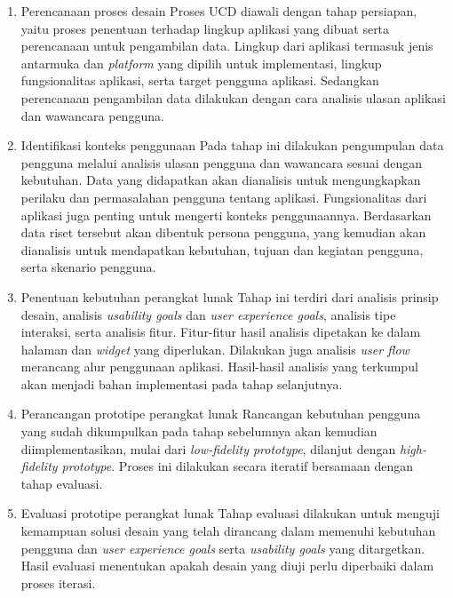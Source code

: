 \begin{enumerate}
  \item Perencanaan proses desain
  \subitem Proses UCD diawali dengan tahap persiapan, yaitu proses penentuan terhadap lingkup aplikasi yang dibuat serta perencanaan untuk pengambilan data. Lingkup dari aplikasi termasuk jenis antarmuka dan \textit{platform} yang dipilih untuk implementasi, lingkup fungsionalitas aplikasi, serta target pengguna aplikasi. Sedangkan perencanaan pengambilan data dilakukan dengan cara analisis ulasan aplikasi dan wawancara pengguna.

  \item Identifikasi konteks penggunaan
  \subitem Pada tahap ini dilakukan pengumpulan data pengguna melalui analisis ulasan pengguna dan wawancara sesuai dengan kebutuhan. Data yang didapatkan akan dianalisis untuk mengungkapkan perilaku dan permasalahan pengguna tentang aplikasi. Fungsionalitas dari aplikasi juga penting untuk mengerti konteks penggunaannya. Berdasarkan data riset tersebut akan dibentuk persona pengguna, yang kemudian akan dianalisis untuk mendapatkan kebutuhan, tujuan dan kegiatan pengguna, serta skenario pengguna.
   
  \item Penentuan kebutuhan perangkat lunak
  \subitem Tahap ini terdiri dari analisis prinsip desain, analisis \textit{usability goals} dan \textit{user experience goals}, analisis tipe interaksi, serta analisis fitur. Fitur-fitur hasil analisis dipetakan ke dalam halaman dan \textit{widget} yang diperlukan. Dilakukan juga analisis \textit{user flow} merancang alur penggunaan aplikasi. Hasil-hasil analisis yang terkumpul akan menjadi bahan implementasi pada tahap selanjutnya.
  
  \item Perancangan prototipe perangkat lunak
  \subitem Rancangan kebutuhan pengguna yang sudah dikumpulkan pada tahap sebelumnya akan kemudian diimplementasikan, mulai dari \textit{low-fidelity prototype}, dilanjut dengan \textit{high-fidelity prototype}. Proses ini dilakukan secara iteratif bersamaan dengan tahap evaluasi.
  
  \item Evaluasi prototipe perangkat lunak
  \subitem Tahap evaluasi dilakukan untuk menguji kemampuan solusi desain yang telah dirancang dalam memenuhi kebutuhan pengguna dan \textit{user experience goals} serta \textit{usability goals} yang ditargetkan. Hasil evaluasi menentukan apakah desain yang diuji perlu diperbaiki dalam proses iterasi.

  
\end{enumerate}


